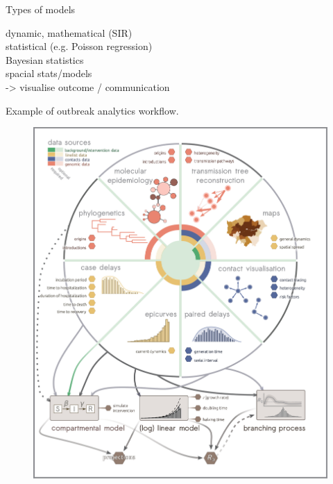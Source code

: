 \documentclass[table]{beamer}\usepackage[]{graphicx}\usepackage[]{color}
\begin{document}
\begin{frame}[fragile]{Types of models}

dynamic, mathematical (SIR) \\
statistical (e.g. Poisson regression) \\
Bayesian statistics \\
spacial stats/models \\

-> visualise outcome / communication

\end{frame}


\begin{frame}[fragile]{Example of outbreak analytics workflow.}
\begin{center}
\begin{figure}
  \centering
  \includegraphics[width=\textwidth,height=0.8\textheight,keepaspectratio]{polonsky2019_Fig2.png}
\end{figure}
\end{center}
\end{frame}
\end{document}
